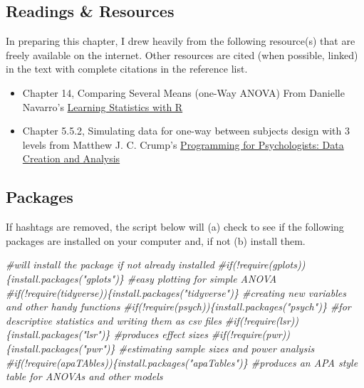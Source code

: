 \documentclass[
  english,
]{book}
\newenvironment{Shaded}{\begin{snugshade}}{\end{snugshade}}
\newcommand{\CommentTok}[1]{\textcolor[rgb]{0.56,0.35,0.01}{\textit{#1}}}
\providecommand{\tightlist}{%
  \setlength{\itemsep}{0pt}\setlength{\parskip}{0pt}}
\begin{document}
\hypertarget{readings-resources}{%
\subsection{Readings \& Resources}\label{readings-resources}}

In preparing this chapter, I drew heavily from the following resource(s) that are freely available on the internet. Other resources are cited (when possible, linked) in the text with complete citations in the reference list.

\begin{itemize}
\tightlist
\item
  Chapter 14, Comparing Several Means (one-Way ANOVA) From Danielle Navarro's \href{https://learningstatisticswithr.com/}{Learning Statistics with R}
\item
  Chapter 5.5.2, Simulating data for one-way between subjects design with 3 levels from Matthew J. C. Crump's \href{https://crumplab.github.io/programmingforpsych/simulating-and-analyzing-data-in-r.html\#single-factor-anovas-data-simulation-and-analysis}{Programming for Psychologists: Data Creation and Analysis}
\end{itemize}

\hypertarget{packages}{%
\subsection{Packages}\label{packages}}

If hashtags are removed, the script below will (a) check to see if the following packages are installed on your computer and, if not (b) install them.

\begin{Shaded}
\begin{Highlighting}[]
\CommentTok{#will install the package if not already installed}
\CommentTok{#if(!require(gplots))\{install.packages("gplots")\} #easy plotting for simple ANOVA}
\CommentTok{#if(!require(tidyverse))\{install.packages("tidyverse")\} #creating new variables and other handy functions}
\CommentTok{#if(!require(psych))\{install.packages("psych")\} #for descriptive statistics and writing them as csv files}
\CommentTok{#if(!require(lsr))\{install.packages("lsr")\} #produces effect sizes}
\CommentTok{#if(!require(pwr))\{install.packages("pwr")\} #estimating sample sizes and power analysis}
\CommentTok{#if(!require(apaTAbles))\{install.packages("apaTables")\} #produces an APA style table for ANOVAs and other models}
\end{Highlighting}
\end{Shaded}
\end{document}
